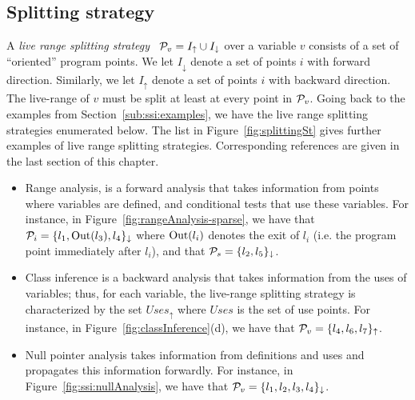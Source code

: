\subsection{Splitting strategy}
A {\em live range splitting strategy} \
${\cal P}_v = I_\uparrow \cup I_\downarrow$ over a variable $v$ consists of a set
of ``oriented'' program points.
We let $I_\downarrow$ denote a set of points $i$ with forward direction.
Similarly, we let $I_\uparrow$ denote a set of points $i$ with backward
direction.
The live-range of $v$ must be split at least at every point in ${\cal P}_v$.
Going back to the examples from Section~\ref{sub:ssi:examples}, we have the live range splitting strategies enumerated below.
The list in Figure~\ref{fig:splittingSt} gives further examples of live range splitting strategies. Corresponding references are given in the last section of this chapter.

\begin{itemize}
\item Range analysis, is a forward analysis that takes information from points where variables are defined, and conditional tests that use these variables.
For instance, in Figure~\ref{fig:rangeAnalysis-sparse}, we have that ${\cal P}_{i} = \{l_1, \mathrm{Out}(l_3), l_4\}_\downarrow$ where $\mathrm{Out}(l_i)$ denotes the exit of $l_i$ (i.e. the program point immediately after $l_i$), and that ${\cal P}_{s}=\{l_2, l_5\}_\downarrow$.

\item Class inference is a backward analysis that takes information from the uses of variables; thus, for each variable, the live-range splitting strategy is characterized by the set $\mathit{Uses}_\uparrow$ where $\mathit{Uses}$ is the set of use points.
For instance, in Figure~\ref{fig:classInference}(d), we have that
${\cal P}_{v} = \{l_4, l_6,l_7\}_\uparrow$.


\item Null pointer analysis takes information from definitions and uses and propagates this information forwardly.
For instance, in Figure~\ref{fig:ssi:nullAnalysis}, we have that
${\cal P}_{v} = \{l_1, l_2, l_3, l_4\}_\downarrow$.
\end{itemize}

